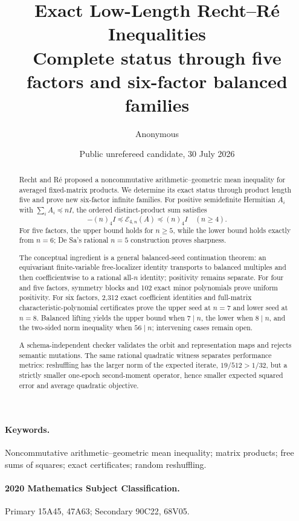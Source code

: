 \documentclass[11pt]{article}
\title{\textbf{Exact Low-Length Recht--R\'e Inequalities}\\[0.35em]
\large Complete status through five factors and six-factor balanced families}
\author{Anonymous}
\date{Public unrefereed candidate, 30 July 2026}
\newcommand{\E}{\mathcal E}
\newcommand{\fall}[2]{(#1)_{#2}}
\begin{document}
\maketitle

\begin{abstract}
Recht and R\'e proposed a noncommutative arithmetic--geometric mean inequality for averaged fixed-matrix products.  We determine its exact status through product length five and prove new six-factor infinite families.  For positive semidefinite Hermitian \(A_i\) with \(\sum_iA_i\preceq nI\), the ordered distinct-product sum satisfies
\[
 -\fall n4I\preceq\E_{4,n}(A)\preceq\fall n4I
 \quad(n\ge4).
\]
For five factors, the upper bound holds for \(n\ge5\), while the lower bound holds exactly from \(n=6\); De Sa's rational \(n=5\) construction proves sharpness.

The conceptual ingredient is a general balanced-seed continuation theorem: an equivariant finite-variable free-localizer identity transports to balanced multiples and then coefficientwise to a rational all-\(n\) identity; positivity remains separate.  For four and five factors, symmetry blocks and 102 exact minor polynomials prove uniform positivity.  For six factors, 2,312 exact coefficient identities and full-matrix characteristic-polynomial certificates prove the upper seed at \(n=7\) and lower seed at \(n=8\).  Balanced lifting yields the upper bound when \(7\mid n\), the lower when \(8\mid n\), and the two-sided norm inequality when \(56\mid n\); intervening cases remain open.

A schema-independent checker validates the orbit and representation maps and rejects semantic mutations.  The same rational quadratic witness separates performance metrics: reshuffling has the larger norm of the expected iterate, \(19/512>1/32\), but a strictly smaller one-epoch second-moment operator, hence smaller expected squared error and average quadratic objective.
\end{abstract}

\paragraph{Keywords.}
Noncommutative arithmetic--geometric mean inequality; matrix products;
free sums of squares; exact certificates; random reshuffling.

\paragraph{2020 Mathematics Subject Classification.}
Primary 15A45, 47A63; Secondary 90C22, 68V05.
\end{document}
